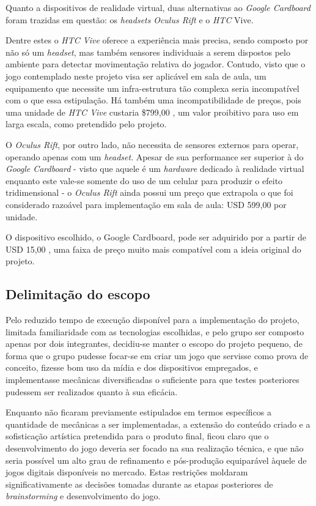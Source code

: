 Quanto a dispositivos de realidade virtual, duas 
alternativas ao \textit{Google Cardboard} foram 
trazidas em questão: os \textit{headsets} 
\textit{Oculus Rift} e o \textit{HTC} Vive. 

Dentre estes o \textit{HTC Vive} oferece a 
experiência mais precisa, sendo composto por não 
só um \textit{headset}, mas também sensores 
individuais a serem dispostos pelo ambiente para 
detectar movimentação relativa do jogador. 
Contudo, visto que o jogo contemplado neste projeto 
visa ser aplicável em sala de aula, um equipamento 
que necessite um infra-estrutura tão complexa seria 
incompatível com o que essa estipulação. Há também 
uma incompatibilidade de preços, pois uma unidade de 
\textit{HTC Vive} custaria \$799,00  
\cite{vive:2016:store}, um valor proibitivo para 
uso em larga escala, como pretendido pelo projeto.

O \textit{Oculus Rift}, por outro lado, não 
necessita de sensores externos para operar, 
operando apenas com um \textit{headset}. Apesar 
de sua performance ser superior à do 
\textit{Google Cardboard} - visto que aquele é um 
\textit{hardware} dedicado à realidade virtual 
enquanto este vale-se somente do uso de um celular 
para produzir o efeito tridimensional - o 
\textit{Oculus Rift} ainda possui um preço que 
extrapola o que foi considerado razoável para 
implementação em sala de aula: USD 599,00  
\cite{rift:2016:store} por unidade.

O dispositivo escolhido, o Google Cardboard, pode 
ser adquirido por a partir de USD 15,00  
\cite{cardboard:2016:store}, uma faixa de preço 
muito mais compatível com a ideia original do projeto.

\subsection{Delimitação do escopo}\label{subsec-delimitacao-escopo}

Pelo reduzido tempo de execução disponível para a implementação do projeto,
limitada familiaridade com as tecnologias escolhidas, e pelo grupo ser
composto apenas por dois integrantes, decidiu-se manter o escopo do projeto
pequeno, de forma que o grupo pudesse focar-se em criar um jogo que servisse
como prova de conceito, fizesse bom uso da mídia e dos dispositivos empregados,
e implementasse mecânicas diversificadas o suficiente para que testes posteriores
pudessem ser realizados quanto à sua eficácia.

Enquanto não ficaram previamente estipulados em termos específicos a quantidade de
mecânicas a ser implementadas, a extensão do conteúdo criado e a sofisticação
artística pretendida para o produto final, ficou claro que o desenvolvimento do
jogo deveria ser focado na sua realização técnica, e que não seria possível um
alto grau de refinamento e pós-produção equiparável àquele de jogos digitais
disponíveis no mercado. Estas restrições moldaram significativamente as decisões
tomadas durante as etapas posteriores de \textit{brainstorming} e desenvolvimento do
jogo.

